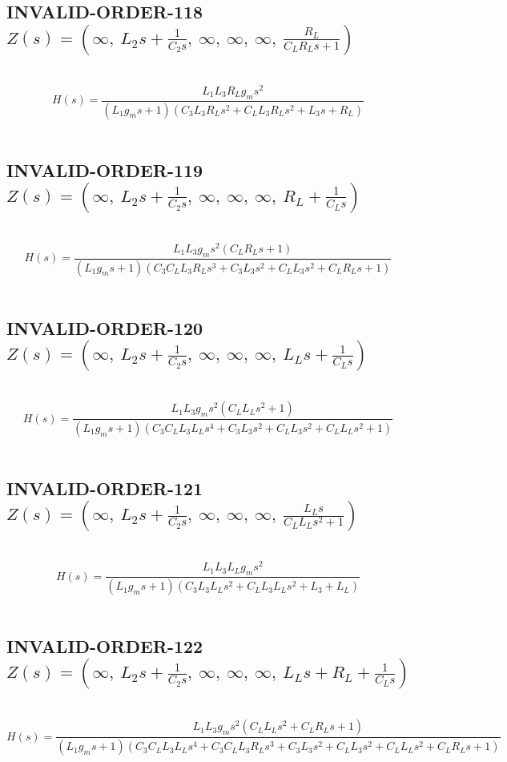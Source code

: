 \documentclass{article}
\begin{document}
\subsection{INVALID-ORDER-118 $Z(s) = \left( \infty, \  L_{2} s + \frac{1}{C_{2} s}, \  \infty, \  \infty, \  \infty, \  \frac{R_{L}}{C_{L} R_{L} s + 1}\right)$ } \ 
\textbf{\[H(s) = \frac{L_{1} L_{3} R_{L} g_{m} s^{2}}{\left(L_{1} g_{m} s + 1\right) \left(C_{3} L_{3} R_{L} s^{2} + C_{L} L_{3} R_{L} s^{2} + L_{3} s + R_{L}\right)}\] } \ 
\subsection{INVALID-ORDER-119 $Z(s) = \left( \infty, \  L_{2} s + \frac{1}{C_{2} s}, \  \infty, \  \infty, \  \infty, \  R_{L} + \frac{1}{C_{L} s}\right)$ } \ 
\textbf{\[H(s) = \frac{L_{1} L_{3} g_{m} s^{2} \left(C_{L} R_{L} s + 1\right)}{\left(L_{1} g_{m} s + 1\right) \left(C_{3} C_{L} L_{3} R_{L} s^{3} + C_{3} L_{3} s^{2} + C_{L} L_{3} s^{2} + C_{L} R_{L} s + 1\right)}\] } \ 
\subsection{INVALID-ORDER-120 $Z(s) = \left( \infty, \  L_{2} s + \frac{1}{C_{2} s}, \  \infty, \  \infty, \  \infty, \  L_{L} s + \frac{1}{C_{L} s}\right)$ } \ 
\textbf{\[H(s) = \frac{L_{1} L_{3} g_{m} s^{2} \left(C_{L} L_{L} s^{2} + 1\right)}{\left(L_{1} g_{m} s + 1\right) \left(C_{3} C_{L} L_{3} L_{L} s^{4} + C_{3} L_{3} s^{2} + C_{L} L_{3} s^{2} + C_{L} L_{L} s^{2} + 1\right)}\] } \ 
\subsection{INVALID-ORDER-121 $Z(s) = \left( \infty, \  L_{2} s + \frac{1}{C_{2} s}, \  \infty, \  \infty, \  \infty, \  \frac{L_{L} s}{C_{L} L_{L} s^{2} + 1}\right)$ } \ 
\textbf{\[H(s) = \frac{L_{1} L_{3} L_{L} g_{m} s^{2}}{\left(L_{1} g_{m} s + 1\right) \left(C_{3} L_{3} L_{L} s^{2} + C_{L} L_{3} L_{L} s^{2} + L_{3} + L_{L}\right)}\] } \ 
\subsection{INVALID-ORDER-122 $Z(s) = \left( \infty, \  L_{2} s + \frac{1}{C_{2} s}, \  \infty, \  \infty, \  \infty, \  L_{L} s + R_{L} + \frac{1}{C_{L} s}\right)$ } \ 
\textbf{\[H(s) = \frac{L_{1} L_{3} g_{m} s^{2} \left(C_{L} L_{L} s^{2} + C_{L} R_{L} s + 1\right)}{\left(L_{1} g_{m} s + 1\right) \left(C_{3} C_{L} L_{3} L_{L} s^{4} + C_{3} C_{L} L_{3} R_{L} s^{3} + C_{3} L_{3} s^{2} + C_{L} L_{3} s^{2} + C_{L} L_{L} s^{2} + C_{L} R_{L} s + 1\right)}\] } \ 
\end{document}
